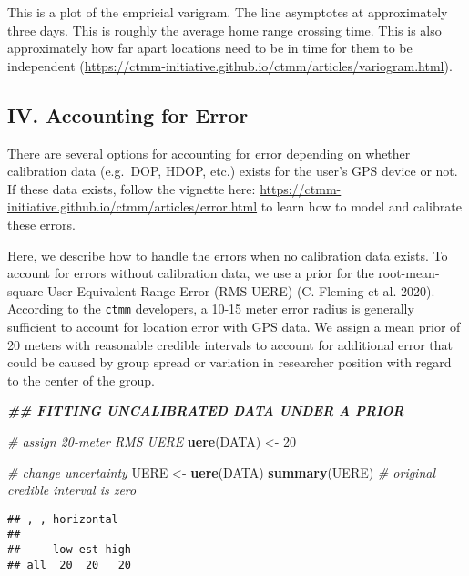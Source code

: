 \documentclass[
]{article}
\newenvironment{Shaded}{\begin{snugshade}}{\end{snugshade}}
\newcommand{\CommentTok}[1]{\textcolor[rgb]{0.56,0.35,0.01}{\textit{#1}}}
\newcommand{\DecValTok}[1]{\textcolor[rgb]{0.00,0.00,0.81}{#1}}
\newcommand{\DocumentationTok}[1]{\textcolor[rgb]{0.56,0.35,0.01}{\textbf{\textit{#1}}}}
\newcommand{\FunctionTok}[1]{\textcolor[rgb]{0.13,0.29,0.53}{\textbf{#1}}}
\newcommand{\NormalTok}[1]{#1}
\newcommand{\OtherTok}[1]{\textcolor[rgb]{0.56,0.35,0.01}{#1}}
\newcommand{\SpecialCharTok}[1]{\textcolor[rgb]{0.81,0.36,0.00}{\textbf{#1}}}
\begin{document}
This is a plot of the empricial varigram. The line asymptotes at
approximately three days. This is roughly the average home range
crossing time. This is also approximately how far apart locations need
to be in time for them to be independent
(\url{https://ctmm-initiative.github.io/ctmm/articles/variogram.html}).

\subsection{IV. Accounting for Error}\label{iv.-accounting-for-error}

There are several options for accounting for error depending on whether
calibration data (e.g.~DOP, HDOP, etc.) exists for the user's GPS device
or not. If these data exists, follow the vignette here:
\url{https://ctmm-initiative.github.io/ctmm/articles/error.html} to
learn how to model and calibrate these errors.

Here, we describe how to handle the errors when no calibration data
exists. To account for errors without calibration data, we use a prior
for the root-mean-square User Equivalent Range Error (RMS UERE) (C.
Fleming et al. 2020). According to the \texttt{ctmm} developers, a 10-15
meter error radius is generally sufficient to account for location error
with GPS data. We assign a mean prior of 20 meters with reasonable
credible intervals to account for additional error that could be caused
by group spread or variation in researcher position with regard to the
center of the group.

\begin{Shaded}
\begin{Highlighting}[]
\DocumentationTok{\#\# FITTING UNCALIBRATED DATA UNDER A PRIOR}

\CommentTok{\# assign 20{-}meter RMS UERE}
\FunctionTok{uere}\NormalTok{(DATA) }\OtherTok{\textless{}{-}} \DecValTok{20}

\CommentTok{\# change uncertainty }
\NormalTok{UERE }\OtherTok{\textless{}{-}} \FunctionTok{uere}\NormalTok{(DATA)}
\FunctionTok{summary}\NormalTok{(UERE) }\CommentTok{\# original credible interval is zero}
\end{Highlighting}
\end{Shaded}

\begin{verbatim}
## , , horizontal
## 
##     low est high
## all  20  20   20
\end{verbatim}

\begin{Shaded}
\end{Shaded}
\end{document}

